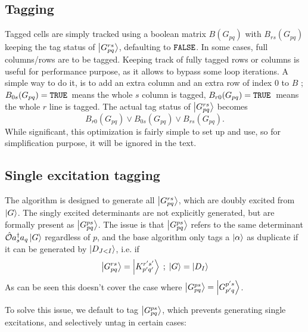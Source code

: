 \documentclass[./thesis.tex]{subfiles}
\begin{document}
\subsection{Tagging}

Tagged cells are simply tracked using a boolean matrix $B(G_{pq})$ with $B_{rs}(G_{pq})$ keeping the tag status of $\ket{G^{rs}_{pq}}$, defaulting to ${\text{\texttt{FALSE}}}$.
In some cases, full columns/rows are to be tagged. Keeping track of fully tagged rows or columns is useful for performance purpose, as it allows to bypass some loop iterations. A simple way to do it, is to add an extra column and an extra row of index $0$ to $B$ ; $B_{0s}(G_{pq}) = {\text{\texttt{TRUE}}}\,$ means the whole $s$ column is tagged, $B_{r0}(G_{pq}) = {\text{\texttt{TRUE}}}\,$ means the whole $r$ line is tagged. The actual tag status of $\ket{G^{rs}_{pq}}$ becomes
\begin{equation}
B_{r0}(G_{pq}) \vee B_{0s}(G_{pq}) \vee B_{rs}(G_{pq}).
\end{equation}
While significant, this optimization is fairly simple to set up and use, so for simplification purpose, it will be ignored in the text.


\subsection{Single excitation tagging}
\label{single_tagging}
The algorithm is designed to generate all $\ket {G_{pq}^{rs}}$, which are doubly excited from $\ket G$. The singly excited determinants are not explicitly generated, but are formally present as $\ket{G_{pq}^{ps}}$.
The issue is that $\ket{G_{pq}^{ps}}$ refers to the same determinant ${\hat{\mathcal{O}}} a^\dagger_s a_q \ket{G}$ regardless of $p$, and the base algorithm only tags a ${\ket{\alpha}}$ as duplicate if it can be generated by $\ket {D_{J < I}}$, i.e. if
\begin{equation}
\ket {G_{pq}^{rs}} = \ket {K_{p'q'}^{r's'}} \; ; \; \ket G = \ket{D_I} 
\end{equation}
As can be seen this doesn't cover the case where $\ket{G_{pq}^{ps}} = \ket{G_{p'q}^{p's}}$.

To solve this issue, we default to tag $\ket {G_{pq}^{ps}}$, which prevents generating single excitations, and selectively untag in certain cases:
\end{document}
